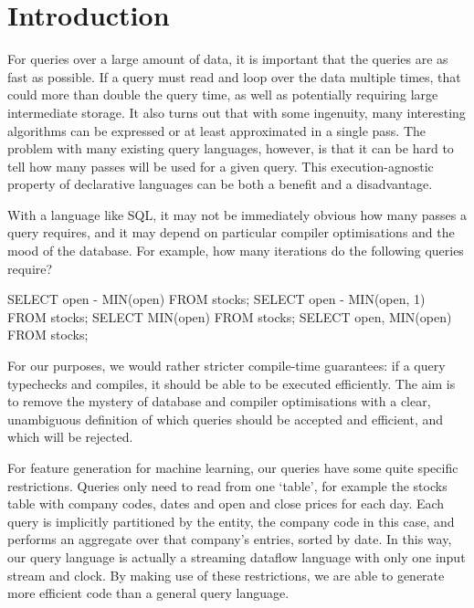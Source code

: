 \section{Introduction}
\label{s:Introduction}

For queries over a large amount of data, it is important that the queries are as fast as possible.
If a query must read and loop over the data multiple times, that could more than double the query time, as well as potentially requiring large intermediate storage.
It also turns out that with some ingenuity, many interesting algorithms can be expressed or at least approximated in a single pass.
The problem with many existing query languages, however, is that it can be hard to tell how many passes will be used for a given query.
This execution-agnostic property of declarative languages can be both a benefit and a disadvantage.

With a language like SQL, it may not be immediately obvious how many passes a query requires, and it may depend on particular compiler optimisations and the mood of the database.
For example, how many iterations do the following queries require?

\begin{code}
SELECT open - MIN(open)    FROM stocks;
SELECT open - MIN(open, 1) FROM stocks;
SELECT        MIN(open)    FROM stocks;
SELECT open,  MIN(open)    FROM stocks;
\end{code}

For our purposes, we would rather stricter compile-time guarantees: if a query typechecks and compiles, it should be able to be executed efficiently.
The aim is to remove the mystery of database and compiler optimisations with a clear, unambiguous definition of which queries should be accepted and efficient, and which will be rejected.

For feature generation for machine learning, our queries have some quite specific restrictions.
Queries only need to read from one `table', for example the stocks table with company codes, dates and open and close prices for each day.
Each query is implicitly partitioned by the entity, the company code in this case, and performs an aggregate over that company's entries, sorted by date.
In this way, our query language is actually a streaming dataflow language with only one input stream and clock.
By making use of these restrictions, we are able to generate more efficient code than a general query language.

